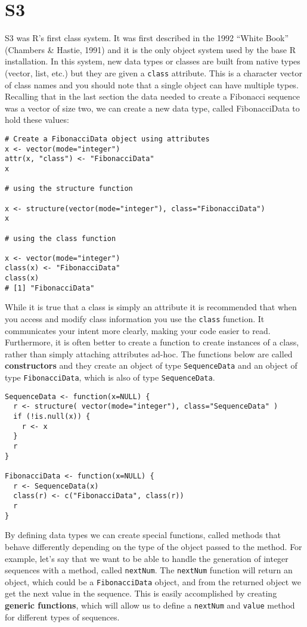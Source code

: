 \hypertarget{s3-ss}{%
\section{S3}\label{s3-ss}}

S3 was R's first class system. It was first described in the 1992
``White Book'' (Chambers \& Hastie, 1991) and it is the only object
system used by the base R installation. In this system, new data types
or classes are built from native types (vector, list, etc.) but they are
given a \texttt{class} attribute. This is a character vector of class
names and you should note that a single object can have multiple types.
Recalling that in the last section the data needed to create a Fibonacci
sequence was a vector of size two, we can create a new data type, called
FibonacciData to hold these values:

\begin{verbatim}
# Create a FibonacciData object using attributes
x <- vector(mode="integer")
attr(x, "class") <- "FibonacciData"
x

# using the structure function

x <- structure(vector(mode="integer"), class="FibonacciData")
x

# using the class function

x <- vector(mode="integer")
class(x) <- "FibonacciData"
class(x)
# [1] "FibonacciData"
\end{verbatim}

While it is true that a class is simply an attribute it is recommended
that when you access and modify class information you use the
\texttt{class} function. It communicates your intent more clearly,
making your code easier to read. Furthermore, it is often better to
create a function to create instances of a class, rather than simply
attaching attributes ad-hoc. The functions below are called
\textbf{constructors} and they create an object of type
\texttt{SequenceData} and an object of type \texttt{FibonacciData},
which is also of type \texttt{SequenceData}.

\begin{verbatim}
SequenceData <- function(x=NULL) {
  r <- structure( vector(mode="integer"), class="SequenceData" )
  if (!is.null(x)) {
    r <- x
  }
  r
}

FibonacciData <- function(x=NULL) {
  r <- SequenceData(x)
  class(r) <- c("FibonacciData", class(r))
  r
}
\end{verbatim}

By defining data types we can create special functions, called methods
that behave differently depending on the type of the object passed to
the method. For example, let's say that we want to be able to handle the
generation of integer sequences with a method, called \texttt{nextNum}.
The \texttt{nextNum} function will return an object, which could be a
\texttt{FibonacciData} object, and from the returned object we get the
next value in the sequence. This is easily accomplished by creating
\textbf{generic functions}, which will allow us to define a
\texttt{nextNum} and \texttt{value} method for different types of
sequences.

